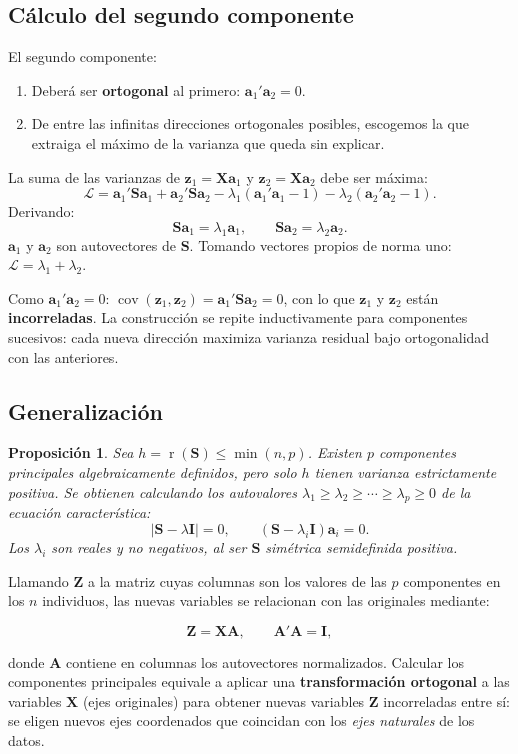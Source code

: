 \documentclass[12pt, a4paper]{article}
\theoremstyle{plain}
\newtheorem{proposicion}[teorema]{Proposición}
\theoremstyle{definition}
\theoremstyle{remark}
\newcommand{\mat}[1]{\mathbf{#1}}
\newcommand{\rg}{\operatorname{r}}
\begin{document}
\subsection{Cálculo del segundo componente}

El segundo componente:
\begin{enumerate}[label=\alph*)]
  \item Deberá ser \textbf{ortogonal} al primero: $\mathbf{a}_1'\mathbf{a}_2=0$.
  \item De entre las infinitas direcciones ortogonales posibles, escogemos la
        que extraiga el máximo de la varianza que queda sin explicar.
\end{enumerate}

La suma de las varianzas de $\mathbf{z}_1=\mathbf{X}\mathbf{a}_1$ y
$\mathbf{z}_2=\mathbf{X}\mathbf{a}_2$ debe ser máxima:
\[
  \mathcal{L} = \mathbf{a}_1'\mat{S}\mathbf{a}_1+\mathbf{a}_2'\mat{S}\mathbf{a}_2
  -\lambda_1(\mathbf{a}_1'\mathbf{a}_1-1)-\lambda_2(\mathbf{a}_2'\mathbf{a}_2-1).
\]
Derivando:
\[
  \mat{S}\mathbf{a}_1=\lambda_1\mathbf{a}_1, \qquad \mat{S}\mathbf{a}_2=\lambda_2\mathbf{a}_2.
\]
$\mathbf{a}_1$ y $\mathbf{a}_2$ son autovectores de $\mat{S}$. Tomando
vectores propios de norma uno: $\mathcal{L}=\lambda_1+\lambda_2$.

Como $\mathbf{a}_1'\mathbf{a}_2=0$:
$\operatorname{cov}(\mathbf{z}_1,\mathbf{z}_2)=\mathbf{a}_1'\mat{S}\mathbf{a}_2=0$,
con lo que $\mathbf{z}_1$ y $\mathbf{z}_2$ están \textbf{incorreladas}.
La construcción se repite inductivamente para componentes sucesivos: cada nueva
dirección maximiza varianza residual bajo ortogonalidad con las anteriores.

\subsection{Generalización}

\begin{proposicion}
Sea $h=\rg(\mat{S})\le \min(n,p)$. Existen $p$ componentes principales
algebraicamente definidos, pero solo $h$ tienen varianza estrictamente positiva.
Se obtienen calculando los autovalores
$\lambda_1\ge\lambda_2\ge\cdots\ge\lambda_p\ge0$ de la ecuación característica:
\[
  |\mat{S}-\lambda\mat{I}|=0, \qquad (\mat{S}-\lambda_i\mat{I})\mathbf{a}_i=0.
\]
Los $\lambda_i$ son reales y no negativos, al ser $\mat{S}$ simétrica
semidefinida positiva.
\end{proposicion}

Llamando $\mat{Z}$ a la matriz cuyas columnas son los valores de las $p$
componentes en los $n$ individuos, las nuevas variables se relacionan con las
originales mediante:
\begin{mdframed}[style=resultado]
\[
  \mat{Z} = \mathbf{X}\mat{A}, \qquad \mat{A}'\mat{A}=\mat{I},
\]
\end{mdframed}
donde $\mat{A}$ contiene en columnas los autovectores normalizados. Calcular
los componentes principales equivale a aplicar una \textbf{transformación
ortogonal} a las variables $\mathbf{X}$ (ejes originales) para obtener nuevas
variables $\mat{Z}$ incorreladas entre sí: se eligen nuevos ejes coordenados
que coincidan con los \emph{ejes naturales} de los datos.
\end{document}
